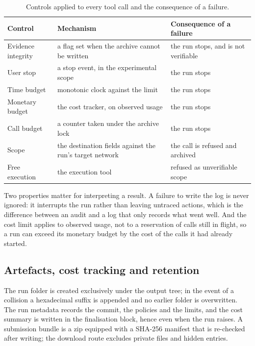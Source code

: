\begin{table}[H]
\centering
\caption{Controls applied to every tool call and the consequence of a failure.}
\label{tab:executor}
\small
\begin{tabular}{@{}p{3.6cm}p{5.2cm}p{5.0cm}@{}}
\toprule
Control & Mechanism & Consequence of a failure \\
\midrule
Evidence integrity & a flag set when the archive cannot be written & the run stops, and is not verifiable \\
User stop & a stop event, in the experimental scope & the run stops \\
Time budget & monotonic clock against the limit & the run stops \\
Monetary budget & the cost tracker, on observed usage & the run stops \\
Call budget & a counter taken under the archive lock & the run stops \\
Scope & the destination fields against the run's target network & the call is refused and archived \\
Free execution & the execution tool & refused as unverifiable scope \\
\bottomrule
\end{tabular}
\end{table}

Two properties matter for interpreting a result. A failure to write the log is
never ignored: it interrupts the run rather than leaving untraced actions, which
is the difference between an audit and a log that only records what went well. And
the cost limit applies to observed usage, not to a reservation of calls still in
flight, so a run can exceed its monetary budget by the cost of the calls it had
already started.

\subsection{Artefacts, cost tracking and retention}

The run folder is created exclusively under the output tree; in the event of a
collision a hexadecimal suffix is appended and no earlier folder is overwritten.
The run metadata records the commit, the policies and the limits, and the cost
summary is written in the finalisation block, hence even when the run raises. A
submission bundle is a zip equipped with a SHA-256 manifest that is re-checked
after writing; the download route excludes private files and hidden entries.

